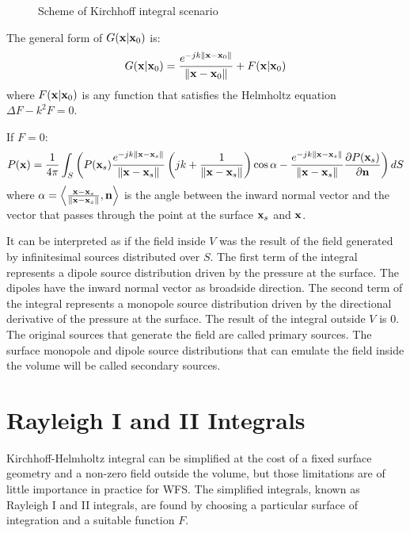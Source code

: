 \begin{figure}[h]
	\centering
	\def\svgwidth{1\columnwidth}
	\graphicspath{{../TFM/Img/}}
	
	\caption{Scheme of Kirchhoff integral scenario}
	\label{KirchhoffIntegralScheme}
\end{figure}

The general form of $G(\PosTheo \vert \PosTheo_0)$ is:
\begin{equation}
G(\PosTheo \vert \PosTheo_0) = \GreenFunc[\PosTheo - \PosTheo_0] + F(\PosTheo \vert \PosTheo_0)
\label{GreensFunction}
\end{equation}
where $F(\PosTheo \vert \PosTheo_0)$ is any function that satisfies the Helmholtz equation $\Delta F - k^2 F = 0$.

If $F = 0$:
\begin{equation}
P(\PosTheo) = \frac{1}{4\pi} \int_{S} \left(P(\PosTheo[surface]) \GreenFunc[{\PosTheo - \PosTheo[surface]}] \left(jk + \frac{1}{\norm{\PosTheo - \PosTheo[surface]}}\right)\cos\normSecondPropAngle - \GreenFunc[{\PosTheo - \PosTheo[surface]}] \frac{\partial P(\PosTheo[surface])}{\partial \mathbf{n}} \right) dS
\end{equation}
where $\normSecondPropAngle = \left\langle \frac{\PosTheo - \PosTheo[surface]}{\norm{\PosTheo - \PosTheo[surface]}} , \vec{n} \right\rangle$ is the angle between the inward normal vector and the vector that passes through the point at the surface $\PosTheo[surface]$ and $\PosTheo$.

It can be interpreted as if the field inside $V$ was the result of the field generated by infinitesimal sources distributed over $S$. The first term of the integral represents a dipole source distribution driven by the pressure at the surface. The dipoles have the inward normal vector as broadside direction. The second term of the integral represents a monopole source distribution driven by the directional derivative of the pressure at the surface. The result of the integral outside $V$ is $0$. The original sources that generate the field are called primary sources. The surface monopole and dipole source distributions that can emulate the field inside the volume will be called secondary sources.

\section{Rayleigh I and II Integrals}
Kirchhoff-Helmholtz integral can be simplified at the cost of a fixed surface geometry and a non-zero field outside the volume, but those limitations are of little importance in practice for WFS. The simplified integrals, known as Rayleigh I and II integrals, are found by choosing a particular surface of integration and a suitable function $F$.

